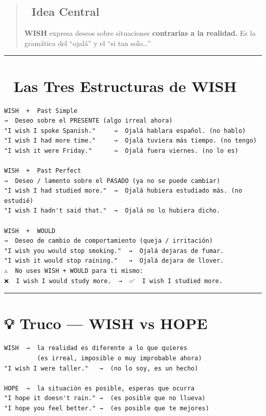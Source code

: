 \documentclass[
  spanish,
  letterpaper,
]{scrbook}
\begin{document}
\begin{quote}
\subsection{🎯 Idea Central}\label{idea-central-14}

\textbf{WISH} expresa deseos sobre situaciones \textbf{contrarias a la
realidad.} Es la gramática del ``ojalá'' y el ``si tan solo\ldots{}''
\end{quote}

\begin{center}\rule{0.5\linewidth}{0.5pt}\end{center}

\section{📐 Las Tres Estructuras de
WISH}\label{las-tres-estructuras-de-wish}

\begin{verbatim}
WISH  +  Past Simple
→  Deseo sobre el PRESENTE (algo irreal ahora)
"I wish I spoke Spanish."     →  Ojalá hablara español. (no hablo)
"I wish I had more time."     →  Ojalá tuviera más tiempo. (no tengo)
"I wish it were Friday."      →  Ojalá fuera viernes. (no lo es)

WISH  +  Past Perfect
→  Deseo / lamento sobre el PASADO (ya no se puede cambiar)
"I wish I had studied more."  →  Ojalá hubiera estudiado más. (no estudié)
"I wish I hadn't said that."  →  Ojalá no lo hubiera dicho.

WISH  +  WOULD
→  Deseo de cambio de comportamiento (queja / irritación)
"I wish you would stop smoking."  →  Ojalá dejaras de fumar.
"I wish it would stop raining."   →  Ojalá dejara de llover.
⚠️  No uses WISH + WOULD para ti mismo:
❌  I wish I would study more.  →  ✅  I wish I studied more.
\end{verbatim}

\begin{center}\rule{0.5\linewidth}{0.5pt}\end{center}

\section{💡 Truco --- WISH vs HOPE}\label{truco-wish-vs-hope}

\begin{verbatim}
WISH  →  la realidad es diferente a lo que quieres
         (es irreal, imposible o muy improbable ahora)
"I wish I were taller."   →  (no lo soy, es un hecho)

HOPE  →  la situación es posible, esperas que ocurra
"I hope it doesn't rain." →  (es posible que no llueva)
"I hope you feel better." →  (es posible que te mejores)
\end{verbatim}
\end{document}
